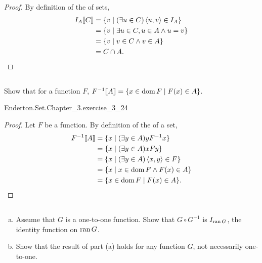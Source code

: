 \documentclass{report}
\begin{document}
\begin{proof}
      By definition of the  of sets,
        \begin{align*}
          I_A\!\left\llbracket C\right\rrbracket
            & = \{v \mid (\exists u \in C) \left< u, v \right> \in I_A\} \\
            & = \{v \mid \exists u \in C, u \in A \land u = v\} \\
            & = \{v \mid v \in C \land v \in A\} \\
            & = C \cap A.
        \end{align*}

  \end{proof}

\subsection{}%

  Show that for a function $F$,
    $F^{-1}\!\left\llbracket A\right\rrbracket = \{x \in \mathop{\text{dom}}{F} \mid F(x) \in A\}$.

    {Enderton.Set.Chapter\_3.exercise\_3\_24}

  \begin{proof}
    Let $F$ be a function.
    By definition of the  of a set,
      \begin{align*}
        F^{-1}\!\left\llbracket A\right\rrbracket
          & = \{x \mid (\exists y \in A) yF^{-1}x\} \\
          & = \{x \mid (\exists y \in A) xFy\} \\
          & = \{x \mid (\exists y \in A) \left< x, y \right> \in F\} \\
          & = \{x \mid x \in \mathop{\text{dom}}{F} \land F(x) \in A\} \\
          & = \{x \in \mathop{\text{dom}}{F} \mid F(x) \in A\}.
      \end{align*}
  \end{proof}

\subsection{}%

  \begin{enumerate}[(a)]
    \item Assume that $G$ is a one-to-one function.
      Show that $G \circ G^{-1}$ is $I_{\mathop{\text{ran}}{G}}$, the identity function on
        $\mathop{\text{ran}}{G}$.
    \item Show that the result of part (a) holds for any function $G$, not
      necessarily one-to-one.
  \end{enumerate}
\end{document}

